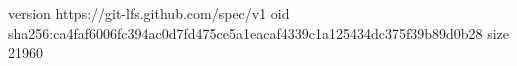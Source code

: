 version https://git-lfs.github.com/spec/v1
oid sha256:ca4faf6006fc394ac0d7fd475ce5a1eacaf4339c1a125434dc375f39b89d0b28
size 21960
